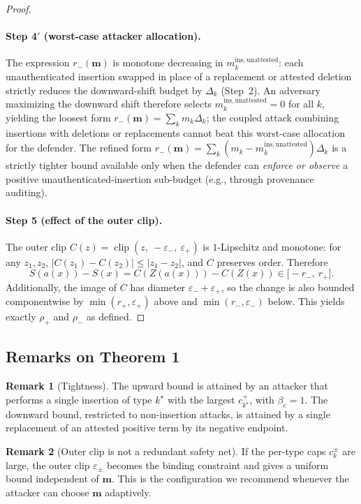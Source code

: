 \documentclass[11pt]{article}
\theoremstyle{plain}
\theoremstyle{definition}
\newtheorem{remark}{Remark}
\DeclareMathOperator{\clip}{clip}
\begin{document}
\begin{proof}
\paragraph{Step 4$'$ (worst-case attacker allocation).}
The expression $r_-(\mathbf m)$ is monotone decreasing in $m_k^{\mathrm{ins,unattested}}$:
each unauthenticated insertion swapped in place of a replacement or attested deletion
strictly reduces the downward-shift budget by $\Delta_k$ (Step~2). An adversary
maximizing the downward shift therefore selects $m_k^{\mathrm{ins,unattested}} = 0$
for all $k$, yielding the loosest form $r_-(\mathbf m) = \sum_k m_k \Delta_k$;
the coupled attack combining insertions with deletions or replacements cannot beat
this worst-case allocation for the defender. The refined form
$r_-(\mathbf m) = \sum_k (m_k - m_k^{\mathrm{ins,unattested}}) \Delta_k$ is a
strictly tighter bound available only when the defender can \emph{enforce or observe}
a positive unauthenticated-insertion sub-budget (e.g., through provenance auditing).

\paragraph{Step 5 (effect of the outer clip).}
The outer clip $C(z) = \clip(z,\ -\varepsilon_-,\ \varepsilon_+)$ is $1$-Lipschitz and monotone:
for any $z_1, z_2$, $|C(z_1) - C(z_2)| \le |z_1 - z_2|$, and $C$ preserves order.
Therefore
\[
S(a(x)) - S(x) = C(Z(a(x))) - C(Z(x)) \in \big[-r_-,\ r_+\big].
\]
Additionally, the image of $C$ has diameter $\varepsilon_- + \varepsilon_+$, so the change is also bounded
componentwise by $\min(r_+, \varepsilon_+)$ above and $\min(r_-, \varepsilon_-)$ below.
This yields exactly $\rho_+$ and $\rho_-$ as defined.
\end{proof}

\subsection{Remarks on Theorem 1}

\begin{remark}[Tightness]\label{rem:thm1-tight}
The upward bound is attained by an attacker that performs a single insertion of type $k^\star$ with the
largest $c_{k^\star}^+$, with $\beta_e = 1$. The downward bound, restricted to non-insertion attacks,
is attained by a single replacement of an attested positive term by its negative endpoint.
\end{remark}

\begin{remark}[Outer clip is not a redundant safety net]
If the per-type caps $c_k^{\pm}$ are large, the outer clip $\varepsilon_\pm$ becomes the binding constraint
and gives a uniform bound independent of $\mathbf m$. This is the configuration we recommend whenever
the attacker can choose $\mathbf m$ adaptively.
\end{remark}
\end{document}
